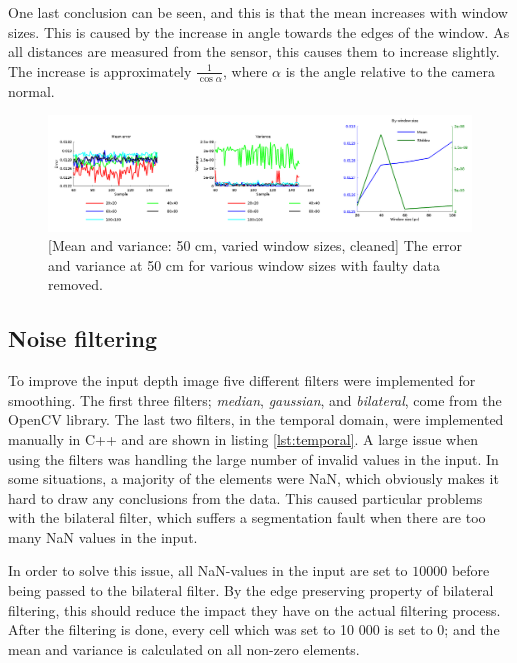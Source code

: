 \documentclass[11pt]{article}
\begin{document}
One last conclusion can be seen, and this is that the mean increases with window
sizes. This is caused by the increase in angle towards the edges of the
window. As all distances are measured from the sensor, this causes them to
increase slightly. The increase is approximately $\frac{1}{\cos \alpha}$, where
$\alpha$ is the angle relative to the camera normal.\par

\begin{figure}[ht]
  \centering
  \includegraphics[width=1\textwidth]{figures/plot2bywindowsize.png}
  [Mean and variance: 50 cm, varied window sizes,
  cleaned]{\label{fig:variedwindow2} The error and variance at 50 cm for various
    window sizes with faulty data removed.}
\end{figure}

\subsection{Noise filtering}

To improve the input depth image five different filters were implemented for
smoothing. The first three filters; \emph{median}, \emph{gaussian}, and
\emph{bilateral}, come from the OpenCV library. The last two filters, in the
temporal domain, were implemented manually in C++ and are shown in listing
\vref{lst:temporal}. A large issue when using the filters was handling the large
number of invalid values in the input. In some situations, a majority of the
elements were NaN, which obviously makes it hard to draw any conclusions from
the data. This caused particular problems with the bilateral filter, which
suffers a segmentation fault when there are too many NaN values in the
input. \par



In order to solve this issue, all NaN-values in the input are set to $10000$
before being passed to the bilateral filter. By the edge preserving property of
bilateral filtering, this should reduce the impact they have on the actual
filtering process. After the filtering is done, every cell which was set to 10
000 is set to 0; and the mean and variance is calculated on all non-zero
elements. \par
\end{document}
